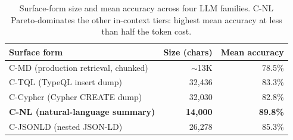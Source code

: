 \begin{table}[t]
\centering
\caption{Surface-form size and mean accuracy across four LLM families.
C-NL Pareto-dominates the other in-context tiers: highest mean accuracy
at less than half the token cost.}
\label{tab:token-cost}
\small
\begin{tabular}{l r r}
\toprule
Surface form & Size (chars) & Mean accuracy \\
\midrule
C-MD (production retrieval, chunked) & $\sim$13K & 78.5\% \\
C-TQL (TypeQL insert dump)            & 32{,}436 & 83.3\% \\
C-Cypher (Cypher CREATE dump)         & 32{,}030 & 82.8\% \\
\textbf{C-NL (natural-language summary)} & \textbf{14{,}000} & \textbf{89.8\%} \\
C-JSONLD (nested JSON-LD)             & 26{,}278 & 85.3\% \\
\bottomrule
\end{tabular}
\end{table}
